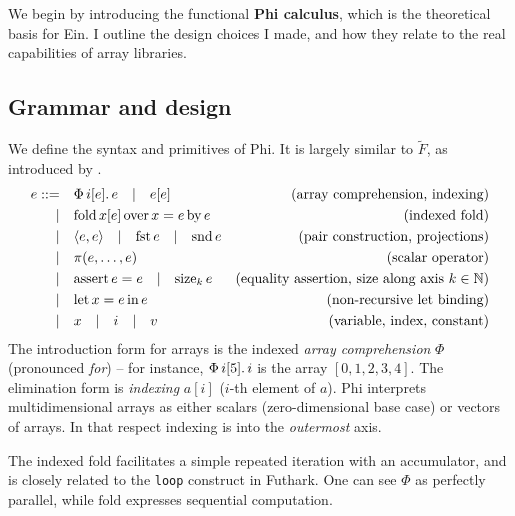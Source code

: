 We begin by introducing the functional \textbf{Phi calculus}, which is the theoretical basis for Ein. I outline the design choices I made, and how they relate to the real capabilities of array libraries.

\subsection{Grammar and design}

\newcommand{\philet}[3]{\mathrm{let}\,{#1}={#2}\,\mathrm{in}\,{#3}}
\newcommand{\phivec}[3]{\Phi\, {#1}[{#2}] \ldotp {#3}}
\newcommand{\phifold}[5]{\mathrm{fold}\,{#1}[{#2}]\,\mathrm{over}\,{#3} = {#4}\,\mathrm{by}\,{#5}}
\newcommand{\phipair}[2]{\left\langle {#1}, {#2} \right\rangle}
\newcommand{\phifst}[1]{\mathrm{fst}\,{#1}}
\newcommand{\phisnd}[1]{\mathrm{snd}\,{#1}}
\newcommand{\phisize}[2]{\mathrm{size}_{#2}\, {#1}}
\newcommand{\phiasserteq}[2]{\mathrm{assert}\,{#1}={#2}}

We define the syntax and primitives of Phi. It is largely similar to $\tilde F$, as introduced by \textcite{shaikhha2019efficient}.
\begin{align*}
e ::=&\quad \phivec{i}{e}{e} \quad|\quad e[e]   &\text{(array comprehension, indexing)} \\
|&\quad \phifold{x}{e}{x}{e}{e}  &\text{(indexed fold)} \\
|&\quad \phipair{e}{e} \quad|\quad \phifst{e} \quad|\quad \phisnd{e} &\text{(pair construction, projections)} \\
|&\quad \pi(e, \dots, e) &\text{(scalar operator)} \\
|&\quad \phiasserteq{e}{e} \quad|\quad \phisize{e}{k} &\text{(equality assertion, size along axis } k \in \mathbb N \text{)} \\
|&\quad \philet{x}{e}{e} &\text{(non-recursive let binding)} \\
|&\quad x \quad|\quad i \quad|\quad v &\text{(variable, index, constant)}
\end{align*}
The introduction form for arrays is the indexed \textit{array comprehension} $\Phi$ (pronounced \textit{for}) -- for instance, $\phivec{i}{5}{i}$ is the array $[0, 1, 2, 3, 4]$. The elimination form is \textit{indexing} $a[i]$ ($i$-th element of $a$). Phi interprets multidimensional arrays as either scalars (zero-dimensional base case) or vectors of arrays. In that respect indexing is into the \textit{outermost} axis. 

The indexed fold facilitates a simple repeated iteration with an accumulator, and is closely related to the \texttt{loop} construct in Futhark. One can see $\Phi$ as perfectly parallel, while $\mathrm{fold}$ expresses sequential computation.

